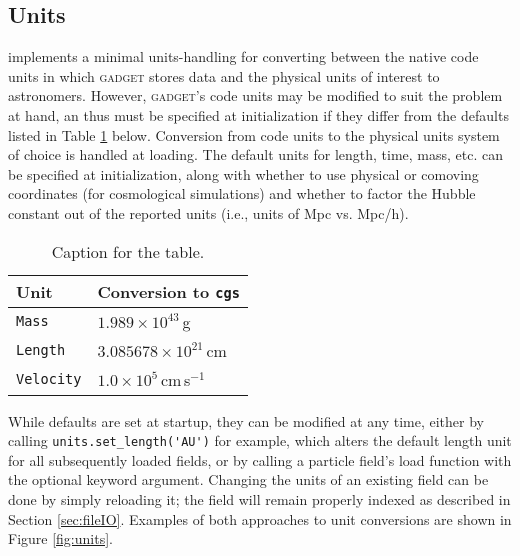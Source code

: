 \subsection{Units}
\label{sec:units}
 implements a minimal units-handling for converting between the native code units in which \textsc{gadget} stores data and the physical units of interest to astronomers.  
However, \textsc{gadget}'s code units may be modified to suit the problem at hand, an thus must be specified at  initialization if they differ from the defaults listed in Table \ref{code_unit_defaults} below.
Conversion from code units to the physical units system of choice is handled at loading.
The default units for length, time, mass, etc. can be specified at initialization, along with whether to use physical or comoving coordinates (for cosmological simulations) and whether to factor the Hubble constant out of the reported units (i.e., units of Mpc vs. Mpc/h).

\begin{table}[h!]
    \centering
    \caption{Caption for the table.}
    \label{code_unit_defaults}
    \begin{tabular}{ll}
        \hline
        Unit & Conversion to \verb|cgs|\\
        \hline
        \verb|Mass| &  $1.989\times10^{43}\,$g\\ 
        \verb|Length| & $3.085678\times10^{21}\,$cm \\ 
        \verb|Velocity| & $1.0\times10^5\,$cm$\,$s$^{-1}$ \\ 
    \end{tabular} 
\end{table}

While defaults are set at startup, they can be modified at any time, either by calling \verb|units.set_length('AU')| for example, which alters the default length unit for all subsequently loaded fields, or by calling a particle field's load function with the optional  keyword argument.  
Changing the units of an existing field can be done by simply reloading it; the field will remain properly indexed as described in Section \ref{sec:fileIO}. Examples of both approaches to unit conversions are shown in Figure \ref{fig:units}.
